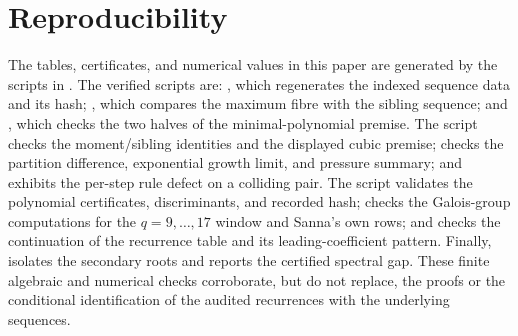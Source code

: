 \section*{Reproducibility}
The tables, certificates, and numerical values in this paper are generated by
the scripts in .  The verified scripts are:
, which regenerates the indexed
sequence data and its hash; ,
which compares the maximum fibre with the sibling sequence; and
, which checks the two
halves of the minimal-polynomial premise.  The script
 checks the moment/sibling
identities and the displayed cubic premise; 
checks the partition difference, exponential growth limit, and pressure
summary; and  exhibits the
per-step rule defect on a colliding pair.  The script
 validates the polynomial
certificates, discriminants, and recorded hash; 
checks the Galois-group computations for the \(q=9,\dots,17\) window and
Sanna's own rows; and
 checks the continuation of
the recurrence table and its leading-coefficient pattern.  Finally,
 isolates the secondary roots and
reports the certified spectral gap.  These finite algebraic and numerical
checks corroborate, but do not replace, the proofs or the conditional
identification of the audited recurrences with the underlying sequences.
